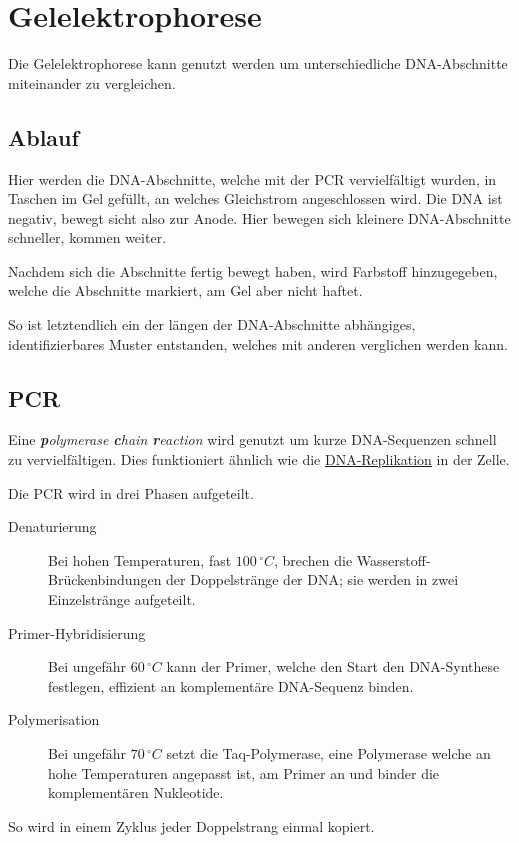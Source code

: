 \documentclass{article}
\begin{document}
\section{Gelelektrophorese} 
Die Gelelektrophorese kann genutzt werden um unterschiedliche DNA-Abschnitte miteinander zu vergleichen.
 
\subsection{Ablauf}
Hier werden die DNA-Abschnitte, welche mit der PCR vervielfältigt wurden, in Taschen im Gel gefüllt, an welches Gleichstrom angeschlossen wird. Die DNA ist negativ, bewegt sicht also zur Anode. Hier bewegen sich kleinere DNA-Abschnitte schneller, kommen weiter.
 
Nachdem sich die Abschnitte fertig bewegt haben, wird Farbstoff hinzugegeben, welche die Abschnitte markiert, am Gel aber nicht haftet.
 
So ist letztendlich ein der längen der DNA-Abschnitte abhängiges, identifizierbares Muster entstanden, welches mit anderen verglichen werden kann. 
 
\subsection{PCR}
Eine \textit{\textbf{p}olymerase \textbf{c}hain \textbf{r}eaction} wird genutzt um kurze DNA-Sequenzen schnell zu vervielfältigen. Dies funktioniert ähnlich wie die \hyperref[Replikation]{DNA-Replikation} in der Zelle. 
 
Die PCR wird in drei Phasen aufgeteilt. 
\begin{description} 
 \item[Denaturierung] Bei hohen Temperaturen, fast $100\,^\circ C$, brechen die Wasserstoff-Brückenbindungen der Doppelstränge der DNA; sie werden in zwei Einzelstränge aufgeteilt.
 \item[Primer-Hybridisierung] Bei ungefähr $60\,^\circ C$ kann der Primer, welche den Start den DNA-Synthese festlegen, effizient an komplementäre DNA-Sequenz binden.
 \item[Polymerisation] Bei ungefähr $70\,^\circ C$ setzt die Taq-Polymerase, eine Polymerase welche an hohe Temperaturen angepasst ist, am Primer an und binder die komplementären Nukleotide.
\end{description} 
So wird in einem Zyklus jeder Doppelstrang einmal kopiert. 
\end{document}
